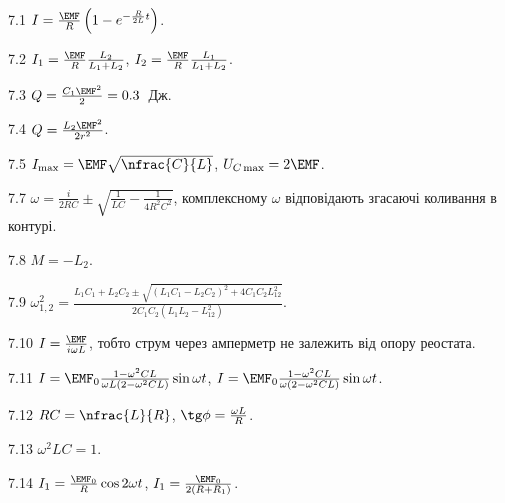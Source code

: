 \protect \section *{\protect {}}
\begin{Solution}{7.{1}}
	$I = \frac{\EMF}{R}\left( 1-e^{-\frac{R}{2L}t}\right) $.
\end{Solution}
\begin{Solution}{7.{2}}
	$I_1 = \frac{\EMF}{R} \frac{L_2}{L_1 + L_2}$, $I_2 = \frac{\EMF}{R} \frac{L_1}{L_1 + L_2}$.
\end{Solution}
\begin{Solution}{7.{3}}
	$Q = \frac{C_1\EMF^2}{2} = 0.3$~Дж.
\end{Solution}
\begin{Solution}{7.{4}}
	$Q = \frac{L_2\EMF^2}{2r^2}$.
\end{Solution}
\begin{Solution}{7.{5}}
	$I_{\max} = \EMF\sqrt{\nfrac{C}{L}}$, $U_{C\max} =2 \EMF$.
\end{Solution}
\begin{Solution}{7.{7}}
	$\omega = \frac{i}{2RC} \pm \sqrt{\frac{1}{LC} - \frac{1}{4R^2C^2}}$, комплексному $\omega$ відповідають згасаючі коливання в контурі.
\end{Solution}
\begin{Solution}{7.{8}}
	$M = -L_2$.
\end{Solution}
\begin{Solution}{7.{9}}
	$\omega_{1,2}^2 = \frac{L_1C_1 + L_2C_2 \pm \sqrt{(L_1C_1 - L_2C_2)^2 + 4C_1C_2L_{12}^2}}{2C_1C_2(L_1L_2 - L_{12}^2)}$.
\end{Solution}
\begin{Solution}{7.{10}}
	$I = \frac{\EMF}{i\omega L}$, тобто струм через амперметр не залежить від опору реостата.
\end{Solution}
\begin{Solution}{7.{11}}
	$I = \EMF_0\frac{1 - \omega^2CL}{\omega L(2 - \omega^2CL)}\sin\omega t$, $I = \EMF_0\frac{1 - \omega^2CL}{\omega(2 - \omega^2CL)}\sin\omega t$.
\end{Solution}
\begin{Solution}{7.{12}}
	$RC = \nfrac{L}{R}$, $\tg\phi = \frac{\omega L}{R}$.
\end{Solution}
\begin{Solution}{7.{13}}
	$\omega^2LC = 1$.
\end{Solution}
\begin{Solution}{7.{14}}
	$I_1 = \frac{\EMF_0}{R}\cos 2\omega t$, $I_1 = \frac{\EMF_0}{2(R + R_1)}$.
\end{Solution}
